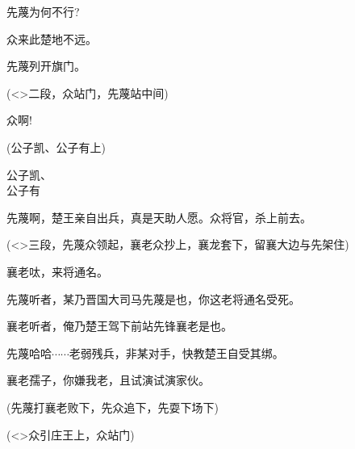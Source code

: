 {先蔑\hspace{30pt}为何不行?

众\hspace{40pt}来此楚地不远。

先蔑\hspace{30pt}列开旗门。

(\textless{}\!\textgreater{}{\hwfs 二段}，众{\hwfs 站门}，先蔑{\hwfs 站中间})


众\hspace{40pt}啊!

(公子凯、公子有{\hwfs 上})

公子凯、\\
公子有\hspace{20pt}\raisebox{5pt}{启司马，楚兵扎颖川地方，先行襄老离此不远。}

先蔑\hspace{30pt}啊，楚王亲自出兵，真是天助人愿。众将官，杀上前去。

(\textless{}\!\textgreater{}{\hwfs 三段}，先蔑众{\hwfs 领起}，襄老众{\hwfs 抄上}，襄{\hwfs 龙套下}，{\hwfs 留}襄{\hwfs 大边与}先{\hwfs 架住})

襄老\hspace{30pt}呔，来将通名。

先蔑\hspace{30pt}听者，某乃晋国大司马先蔑是也，你这老将通名受死。

襄老\hspace{30pt}听者，俺乃楚王驾下前站先锋襄老是也。

先蔑\hspace{30pt}哈哈$\cdots{}\cdots{}$老弱残兵，非某对手，快教楚王自受其绑。

襄老\hspace{30pt}孺子，你嫌我老，且试演试演家伙。

(先蔑{\hwfs 打}襄老{\hwfs 败下}，先众{\hwfs 追下}，先{\hwfs 耍下场下})

\vspace{5pt}

(\textless{}\!\textgreater{}众{\hwfs 引}庄王{\hwfs 上}，众{\hwfs 站门})


}
